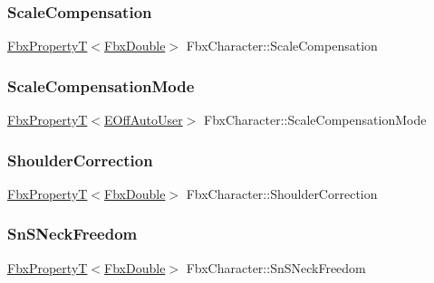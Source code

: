 \subsubsection{\texorpdfstring{Scale\+Compensation}{ScaleCompensation}}
{\footnotesize\ttfamily \hyperlink{class_fbx_property_t}{Fbx\+PropertyT}$<$\hyperlink{fbxtypes_8h_a171e72a1c46fc15c1a6c9c31948c1c5b}{Fbx\+Double}$>$ Fbx\+Character\+::\+Scale\+Compensation}

\mbox{\label{class_fbx_character_afe6b3b37bf087b1a2934873067cad2ab}} 
\subsubsection{\texorpdfstring{Scale\+Compensation\+Mode}{ScaleCompensationMode}}
{\footnotesize\ttfamily \hyperlink{class_fbx_property_t}{Fbx\+PropertyT}$<$\hyperlink{class_fbx_character_ab698a180e6f900ba8317257749c2ecce}{E\+Off\+Auto\+User}$>$ Fbx\+Character\+::\+Scale\+Compensation\+Mode}

\mbox{\label{class_fbx_character_a970018e5956d90bc16b309a23e6ab081}} 
\subsubsection{\texorpdfstring{Shoulder\+Correction}{ShoulderCorrection}}
{\footnotesize\ttfamily \hyperlink{class_fbx_property_t}{Fbx\+PropertyT}$<$\hyperlink{fbxtypes_8h_a171e72a1c46fc15c1a6c9c31948c1c5b}{Fbx\+Double}$>$ Fbx\+Character\+::\+Shoulder\+Correction}

\mbox{\label{class_fbx_character_abbba368e4fd1c169d32f835a6a4dc41d}} 
\subsubsection{\texorpdfstring{Sn\+S\+Neck\+Freedom}{SnSNeckFreedom}}
{\footnotesize\ttfamily \hyperlink{class_fbx_property_t}{Fbx\+PropertyT}$<$\hyperlink{fbxtypes_8h_a171e72a1c46fc15c1a6c9c31948c1c5b}{Fbx\+Double}$>$ Fbx\+Character\+::\+Sn\+S\+Neck\+Freedom}

